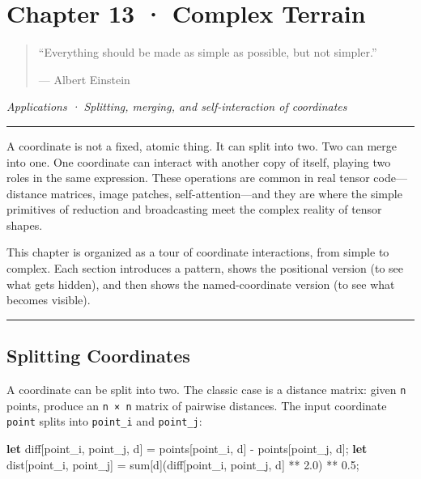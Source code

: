 \documentclass[11pt,]{article}
\newenvironment{Shaded}{}{}
\newcommand{\DecValTok}[1]{\textcolor[rgb]{0.25,0.63,0.44}{#1}}
\newcommand{\KeywordTok}[1]{\textcolor[rgb]{0.00,0.44,0.13}{\textbf{#1}}}
\newcommand{\NormalTok}[1]{#1}
\newcommand{\OperatorTok}[1]{\textcolor[rgb]{0.40,0.40,0.40}{#1}}
\begin{document}
\newpage

\hypertarget{chapter-13-complex-terrain}{%
\section{Chapter 13 · Complex
Terrain}\label{chapter-13-complex-terrain}}

\begin{quote}
``Everything should be made as simple as possible, but not simpler.''

--- Albert Einstein
\end{quote}

\emph{Applications · Splitting, merging, and self-interaction of
coordinates}

\begin{center}\rule{0.5\linewidth}{0.4pt}\end{center}

A coordinate is not a fixed, atomic thing. It can split into two. Two
can merge into one. One coordinate can interact with another copy of
itself, playing two roles in the same expression. These operations are
common in real tensor code---distance matrices, image patches,
self-attention---and they are where the simple primitives of reduction
and broadcasting meet the complex reality of tensor shapes.

This chapter is organized as a tour of coordinate interactions, from
simple to complex. Each section introduces a pattern, shows the
positional version (to see what gets hidden), and then shows the
named-coordinate version (to see what becomes visible).

\begin{center}\rule{0.5\linewidth}{0.4pt}\end{center}

\hypertarget{splitting-coordinates}{%
\subsection{Splitting Coordinates}\label{splitting-coordinates}}

A coordinate can be split into two. The classic case is a distance
matrix: given \texttt{n} points, produce an \texttt{n\ ×\ n} matrix of
pairwise distances. The input coordinate \texttt{point} splits into
\texttt{point\_i} and \texttt{point\_j}:

\begin{Shaded}
\begin{Highlighting}[]
\KeywordTok{let}\NormalTok{ diff}\OperatorTok{[}\NormalTok{point_i, point_j, d}\OperatorTok{]}\NormalTok{ = points}\OperatorTok{[}\NormalTok{point_i, d}\OperatorTok{]}\NormalTok{ - points}\OperatorTok{[}\NormalTok{point_j, d}\OperatorTok{]}\NormalTok{;}
\KeywordTok{let}\NormalTok{ dist}\OperatorTok{[}\NormalTok{point_i, point_j}\OperatorTok{]}\NormalTok{ = sum}\OperatorTok{[}\NormalTok{d}\OperatorTok{]}\NormalTok{(diff}\OperatorTok{[}\NormalTok{point_i, point_j, d}\OperatorTok{]}\NormalTok{ ** }\DecValTok{2.0}\NormalTok{) ** }\DecValTok{0.5}\NormalTok{;}
\end{Highlighting}
\end{Shaded}
\end{document}
